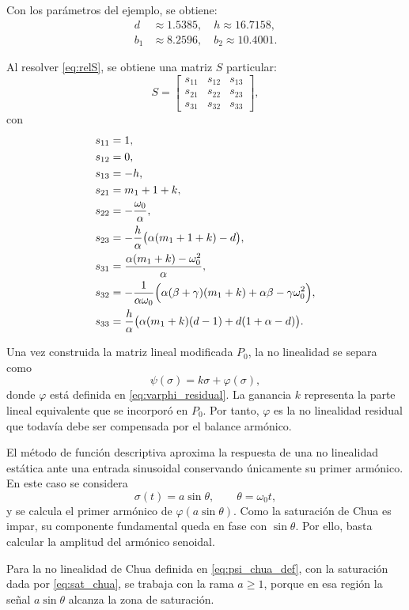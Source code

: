 \documentclass[journal]{IEEEtran}
\begin{document}
Con los parámetros del ejemplo, se obtiene:
\[
\begin{aligned}
d&\approx 1.5385,\quad h\approx 16.7158,\\
b_1&\approx 8.2596,\quad b_2\approx 10.4001.
\end{aligned}
\]

\noindent Al resolver \eqref{eq:relS}, se obtiene una matriz $S$ particular:
\[
S=
\begin{bmatrix}
s_{11} & s_{12} & s_{13}\\
s_{21} & s_{22} & s_{23}\\
s_{31} & s_{32} & s_{33}
\end{bmatrix},
\]
con
\begin{equation*}
\begin{aligned}
s_{11} &= 1,\\
s_{12} &= 0,\\
s_{13} &= -h,\\
s_{21} &= m_1+1+k,\\
s_{22} &= -\frac{\omega_0}{\alpha},\\
s_{23} &= -\frac{h}{\alpha}\bigl(\alpha(m_1+1+k)-d\bigr),\\
s_{31} &= \frac{\alpha(m_1+k)-\omega_0^2}{\alpha},\\
s_{32} &= -\frac{1}{\alpha\omega_0}\Bigl(\alpha(\beta+\gamma)(m_1+k)+\alpha\beta-\gamma\omega_0^2\Bigr),\\
s_{33} &= \frac{h}{\alpha}\bigl(\alpha(m_1+k)(d-1)+d(1+\alpha-d)\bigr).
\end{aligned}
\end{equation*}

Una vez construida la matriz lineal modificada \(P_0\), la no linealidad se
separa como
\[
\psi(\sigma)=k\sigma+\varphi(\sigma),
\]
donde \(\varphi\) está definida en \eqref{eq:varphi_residual}.
La ganancia \(k\) representa la parte lineal equivalente que se incorporó en
\(P_0\). Por tanto, \(\varphi\) es la no linealidad residual que todavía debe
ser compensada por el balance armónico.

El método de función descriptiva aproxima la respuesta de una no linealidad
estática ante una entrada sinusoidal conservando únicamente su primer
armónico. En este caso se considera
\[
\sigma(t)=a\sin\theta,\qquad \theta=\omega_0 t,
\]
y se calcula el primer armónico de \(\varphi(a\sin\theta)\). Como la
saturación de Chua es impar, su componente fundamental queda en fase con
\(\sin\theta\). Por ello, basta calcular la amplitud del armónico senoidal.

Para la no linealidad de Chua definida en \eqref{eq:psi_chua_def}, con la saturación dada por \eqref{eq:sat_chua}, se trabaja con la rama \(a\ge 1\), porque en esa región la señal \(a\sin\theta\) alcanza la zona de saturación.
\end{document}
